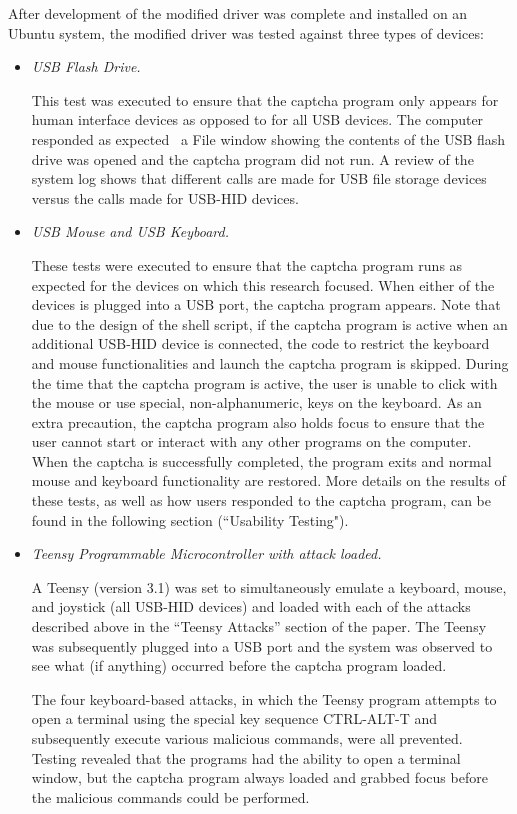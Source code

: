 \documentclass[pagenumbers]{ieee}
\begin{document}
After development of the modified driver was complete and installed on an Ubuntu system, the modified driver was tested against three types of devices: 

\begin{itemize}
\item \textit{USB Flash Drive.}

This test was executed to ensure that the captcha program only appears for human interface devices as opposed to for all USB devices. The computer responded as expected \textemdash \ a File window showing the contents of the USB flash drive was opened and the captcha program did not run. A review of the system log shows that different calls are made for USB file storage devices versus the calls made for USB-HID devices.

\item \textit{USB Mouse and USB Keyboard.}

These tests were executed to ensure that the captcha program runs as expected for the devices on which this research focused. When either of the devices is plugged into a USB port, the captcha program appears. Note that due to the design of the shell script, if the captcha program is active when an additional USB-HID device is connected, the code to restrict the keyboard and mouse functionalities and launch the captcha program is skipped. During the time that the captcha program is active, the user is unable to click with the mouse or use special, non-alphanumeric, keys on the keyboard. As an extra precaution, the captcha program also holds focus to ensure that the user cannot start or interact with any other programs on the computer. When the captcha is successfully completed, the program exits and normal mouse and keyboard functionality are restored. More details on the results of these tests, as well as how users responded to the captcha program, can be found in the following section (``Usability Testing").

\item \textit{Teensy Programmable Microcontroller with attack loaded.}

A Teensy (version 3.1) was set to simultaneously emulate a keyboard, mouse, and joystick (all USB-HID devices) and loaded with each of the attacks described above in the ``Teensy Attacks'' section of the paper. The Teensy was subsequently plugged into a USB port and the system was observed to see what (if anything) occurred before the captcha program loaded. 

The four keyboard-based attacks, in which the Teensy program attempts to open a terminal using the special key sequence CTRL-ALT-T and subsequently execute various malicious commands, were all prevented. Testing revealed that the programs had the ability to open a terminal window, but the captcha program always loaded and grabbed focus before the malicious commands could be performed.


\end{itemize}
\end{document}
